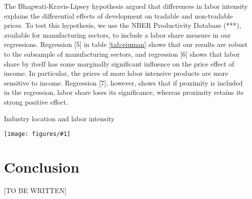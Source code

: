 \documentclass[12pt]{article}
\newcommand{\dotable}[2]{\begin{table}[h!]
\begin{centering}
\caption{#2\label{tab:#1}}
\texttt{[image: figures/\#1]}  
\end{centering}
\end{table}}
\begin{document}
The Bhagwati-Kravis-Lipsey hypothesis argued that differences in labor intensity explains the differential effects of development on tradable and non-tradable prices. To test this hypothesis, we use the NBER Productivity Database (***), available for manufacturing sectors, to include a labor share measure in our regressions. Regression [5] in table \ref{tab:eiuman} shows that our results are robust to the subsample of manufacturing sectors, and regression [6] shows that labor share by itself has some marginally significant influence on the price effect of income. In particular, the prices of more labor intensive products are more sensitive to income. Regression [7], however, shows that if proximity is included in the regression, labor share loses its significance, whereas proximity retains its strong positive effect.

\dotable{eiuman}{Industry location and labor intensity}

\section{Conclusion}
[TO BE WRITTEN]
\end{document}
